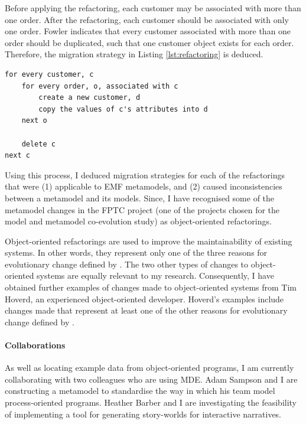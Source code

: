 Before applying the refactoring, each customer may be associated with more than one order. After the refactoring, each customer should be associated with only one order. Fowler indicates that every customer associated with more than one order should be duplicated, such that one customer object exists for each order. Therefore, the migration strategy in Listing \ref{lst:refactoring} is deduced.

\begin{lstlisting}[caption=Migration strategy for the refactoring in pseudo code., label=lst:refactoring]
for every customer, c
	for every order, o, associated with c
		create a new customer, d
		copy the values of c's attributes into d
	next o
	
	delete c
next c
\end{lstlisting}

Using this process, I deduced migration strategies for each of the refactorings that were (1) applicable to EMF metamodels, and (2) caused inconsistencies between a metamodel and its models. Since, I have recognised some of the metamodel changes in the FPTC project (one of the projects chosen for the model and metamodel co-evolution study) as object-oriented refactorings.

Object-oriented refactorings are used to improve the maintainability of existing systems. In other words, they represent only one of the three reasons for evolutionary change defined by \cite{sjoberg93quantifying}. The two other types of changes to object-oriented systems are equally relevant to my research. Consequently, I have obtained further examples of changes made to object-oriented systems from Tim Hoverd, an experienced object-oriented developer. Hoverd's examples include changes made that represent at least one of the other reasons for evolutionary change defined by \cite{sjoberg93quantifying}.



\paragraph{Collaborations} %
\label{par:collaborations}
As well as locating example data from object-oriented programs, I am currently collaborating with two colleagues who are using MDE. Adam Sampson and I are constructing a metamodel to standardise the way in which his team model process-oriented programs. Heather Barber and I are investigating the feasibility of implementing a tool for generating story-worlds for interactive narratives.

